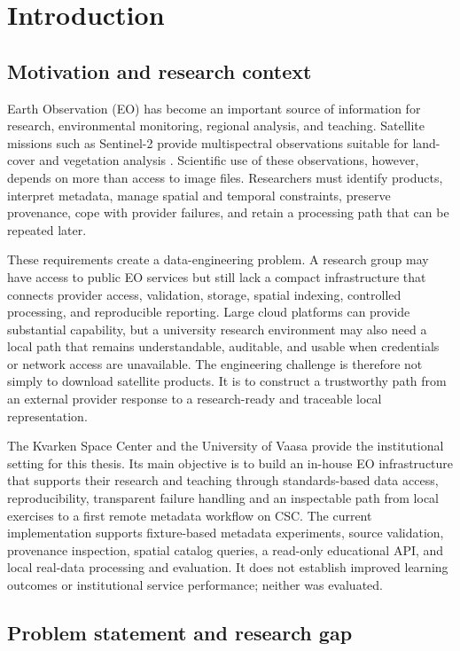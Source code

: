 \chapter{Introduction}

\section{Motivation and research context}

Earth Observation (EO) has become an important source of information for research, environmental monitoring, regional analysis, and teaching. Satellite missions such as Sentinel-2 provide multispectral observations suitable for land-cover and vegetation analysis \citep{drusch2012sentinel}. Scientific use of these observations, however, depends on more than access to image files. Researchers must identify products, interpret metadata, manage spatial and temporal constraints, preserve provenance, cope with provider failures, and retain a processing path that can be repeated later.

These requirements create a data-engineering problem. A research group may have access to public EO services but still lack a compact infrastructure that connects provider access, validation, storage, spatial indexing, controlled processing, and reproducible reporting. Large cloud platforms can provide substantial capability, but a university research environment may also need a local path that remains understandable, auditable, and usable when credentials or network access are unavailable. The engineering challenge is therefore not simply to download satellite products. It is to construct a trustworthy path from an external provider response to a research-ready and traceable local representation.

The Kvarken Space Center and the University of Vaasa provide the institutional setting for
this thesis. Its main objective is to build an in-house EO infrastructure that supports their
research and teaching through standards-based data access, reproducibility, transparent failure
handling and an inspectable path from local exercises to a first remote metadata workflow on
CSC. The current implementation supports fixture-based metadata experiments, source validation,
provenance inspection, spatial catalog queries, a read-only educational API, and local
real-data processing and evaluation. It does not establish improved learning outcomes or
institutional service performance; neither was evaluated.

\section{Problem statement and research gap}


